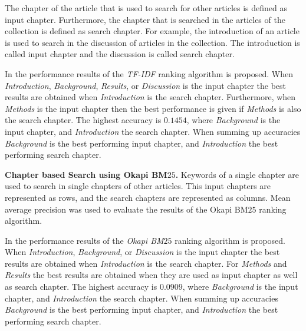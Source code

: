 The chapter of the article that is used to search for other articles is defined as input chapter. Furthermore, the chapter that is searched in the articles of the collection is defined as search chapter. For example, the introduction of an article is used to search in the discussion of articles in the collection. The introduction is called input chapter and the discussion is called search chapter.

In  the performance results of the \textit{TF-IDF} ranking algorithm is proposed. When \textit{Introduction}, \textit{Background}, \textit{Results}, or \textit{Discussion} is the input chapter the best results are obtained when \textit{Introduction} is the search chapter. Furthermore, when \textit{Methods} is the input chapter then the best performance is given if \textit{Methods} is also the search chapter. The highest accuracy is $0.1454$, where \textit{Background} is the input chapter, and \textit{Introduction} the search chapter. When summing up accuracies \textit{Background} is the best performing input chapter, and \textit{Introduction} the best performing search chapter.

\begin{table}[b!]
\vrule{}\vrule
  \caption[Chapter based Search using Okapi BM$25$]{\textbf{Chapter based Search using Okapi BM$25$.} Keywords of a single chapter are used to search in single chapters of other articles. This input chapters are represented as rows, and the search chapters are represented as columns. Mean average precision was used to evaluate the results of the Okapi BM$25$ ranking algorithm.}
  \label{tbl:chapter_based_okapi}
\end{table}

In  the performance results of the \textit{Okapi BM$25$} ranking algorithm is proposed. When \textit{Introduction}, \textit{Background}, or \textit{Discussion} is the input chapter the best results are obtained when \textit{Introduction} is the search chapter. For \textit{Methods} and \textit{Results} the best results are obtained when they are used as input chapter as well as search chapter. The highest accuracy is $0.0909$, where \textit{Background} is the input chapter, and \textit{Introduction} the search chapter. When summing up accuracies \textit{Background} is the best performing input chapter, and \textit{Introduction} the best performing search chapter.

